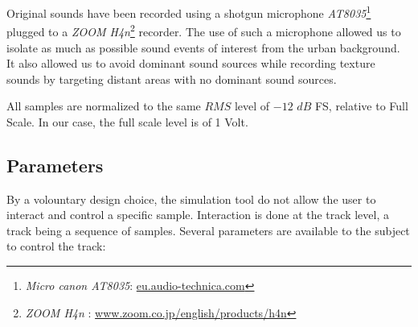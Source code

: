 \documentclass[twoside,twocolumn]{article}
\begin{document}

Original sounds have been recorded using a shotgun microphone \emph{AT8035}\footnote{\emph{Micro canon AT8035}: \url{eu.audio-technica.com}} plugged to a \emph{ZOOM H4n}\footnote{\emph{ZOOM H4n} : \url{www.zoom.co.jp/english/products/h4n}} recorder. The use of such a microphone allowed us to isolate as much as possible sound events of interest from the urban background. It also allowed us to avoid dominant sound sources while recording texture sounds by targeting distant areas with no dominant sound sources.


All samples are normalized to the same $RMS$ level of $-12$ $dB$ FS, \ie relative to Full Scale. In our case, the full scale level is of 1 Volt.

\subsection{Parameters}
\label{sec:simscene_parametre}


By a volountary design choice, the simulation tool do not allow the user to interact and control a specific sample. Interaction is done at the track level, a track being a sequence of samples. Several parameters are available to the subject to control the track:

\end{document}
